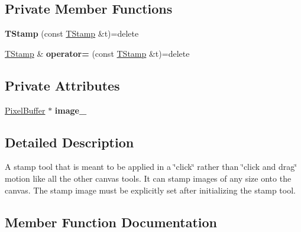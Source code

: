 \subsection*{Private Member Functions}
\begin{DoxyCompactItemize}
\item 
{\bfseries T\+Stamp} (const \hyperlink{classTStamp}{T\+Stamp} \&t)=delete\hypertarget{classTStamp_a7f1eb6b0252f8c01ea1e00c18fcaddcd}{}\label{classTStamp_a7f1eb6b0252f8c01ea1e00c18fcaddcd}

\item 
\hyperlink{classTStamp}{T\+Stamp} \& {\bfseries operator=} (const \hyperlink{classTStamp}{T\+Stamp} \&t)=delete\hypertarget{classTStamp_a7d24e6b1ba90636559d555acefe5b7ed}{}\label{classTStamp_a7d24e6b1ba90636559d555acefe5b7ed}

\end{DoxyCompactItemize}
\subsection*{Private Attributes}
\begin{DoxyCompactItemize}
\item 
\hyperlink{classimage__tools_1_1PixelBuffer}{Pixel\+Buffer} $\ast$ {\bfseries image\+\_\+}\hypertarget{classTStamp_a326bbfe85763910fdb2f0b84a9905725}{}\label{classTStamp_a326bbfe85763910fdb2f0b84a9905725}

\end{DoxyCompactItemize}


\subsection{Detailed Description}
A stamp tool that is meant to be applied in a \char`\"{}click\char`\"{} rather than \char`\"{}click and drag\char`\"{} motion like all the other canvas tools. It can stamp images of any size onto the canvas. The stamp image must be explicitly set after initializing the stamp tool. 

\subsection{Member Function Documentation}
